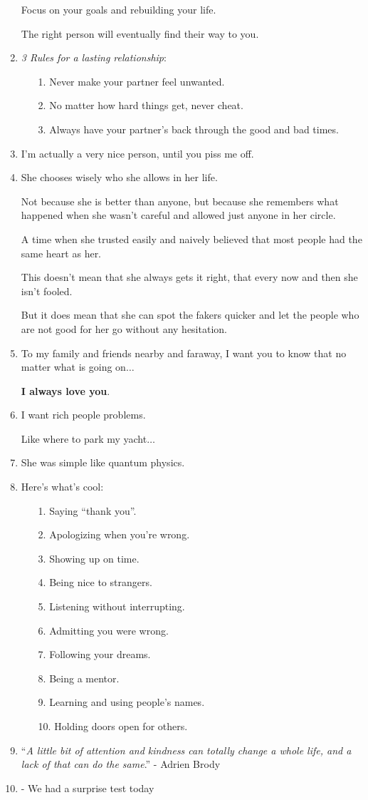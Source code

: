 \documentclass{article}
\begin{document}
\begin{enumerate}
	Focus on your goals and rebuilding your life.
	
	The right person will eventually find their way to you.
	\item \textit{3 Rules for a lasting relationship}:
	\begin{itemize}
		\item[1.] Never make your partner feel unwanted.
		\item[2.] No matter how hard things get, never cheat.
		\item[3.] Always have your partner's back through the good and bad times.
	\end{itemize}
	\item I'm actually a very nice person, until you piss me off.
	\item She chooses wisely who she allows in her life.
	
	Not because she is better than anyone, but because she remembers what happened when she wasn't careful and allowed just anyone in her circle.
	
	A time when she trusted easily and naively believed that most people had the same heart as her.
	
	This doesn't mean that she always gets it right, that every now and then she isn't fooled.
	
	But it does mean that she can spot the fakers quicker and let the people who are not good for her go without any hesitation.
	\item To my family and friends nearby and faraway, I want you to know that no matter what is going on$\ldots$
	
	\textbf{I always love you}.
	\item I want rich people problems.
	
	Like where to park my yacht$\ldots$
	\item She was simple like quantum physics.
	\item Here's what's cool:
	\begin{itemize}
		\item[1.] Saying ``thank you''.
		\item[2.] Apologizing when you're wrong.
		\item[3.] Showing up on time.
		\item[4.] Being nice to strangers.
		\item[5.] Listening without interrupting.
		\item[6.] Admitting you were wrong.
		\item[7.] Following your dreams.
		\item[8.] Being a mentor.
		\item[9.] Learning and using people's names.
		\item[10.] Holding doors open for others.
	\end{itemize}
	\item ``\textit{A little bit of attention and kindness can totally change a whole life, and a lack of that can do the same}.'' - Adrien Brody
	\item - We had a surprise test today
	

\end{enumerate}
\end{document}
